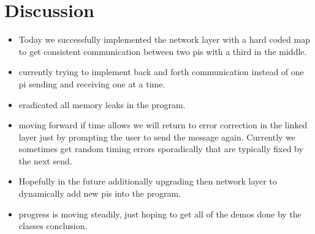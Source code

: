 \documentclass{article}
\begin{document}
\section*{Discussion}
\begin{itemize}
\item Today we successfully implemented the network layer with a hard coded map to get consistent communication between two pis with a third in the middle. 
\item currently trying to implement back and forth communication instead of one pi sending and receiving one at a time.
\item eradicated all memory leaks in the program. 
\item moving forward if time allows we will return to error correction in the linked layer just by prompting the user to send the message again. Currently we sometimes get random timing errors sporadically that are typically fixed by the next send.
\item Hopefully in the future additionally upgrading then network layer to dynamically add new pis into the program.
\item progress is moving steadily, just hoping to get all of the demos done by the classes conclusion. 
\end{itemize}
\end{document}
